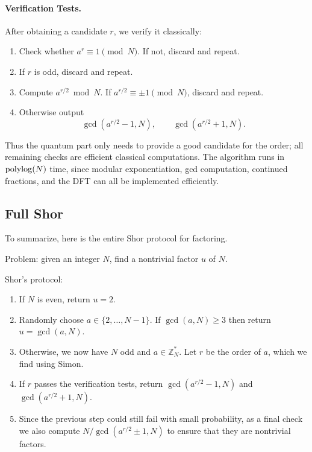 \paragraph{Verification Tests.} After obtaining a candidate \(r\), we verify it classically:
\begin{enumerate}
    \item Check whether \(a^r \equiv 1 \pmod N\). If not, discard and repeat.
    \item If \(r\) is odd, discard and repeat.
    \item Compute \(a^{r/2} \bmod N\). If \(a^{r/2} \equiv \pm1 \pmod N\), discard and repeat.
    \item Otherwise output
    \[
    \gcd(a^{r/2}-1,N), \qquad \gcd(a^{r/2}+1,N).
    \]
\end{enumerate}

Thus the quantum part only needs to provide a good candidate for the order; all remaining checks are efficient classical computations. The algorithm runs in $\operatorname{polylog}(N)$ time, since modular exponentiation, gcd computation, continued fractions, and the DFT can all be implemented efficiently.

\subsection{Full Shor}
To summarize, here is the entire Shor protocol for factoring.

Problem: given an integer $N$, find a nontrivial factor $u$ of $N$.

Shor's protocol:
\begin{enumerate}
    \item If $N$ is even, return $u=2$.
    
    \item Randomly choose $a \in \{2,\dots,N-1\}$. If $\gcd(a,N)\geq 3$ then return $u=\gcd(a,N)$.
    
    \item Otherwise, we now have $N$ odd and $a \in \mathbb{Z}_N^*$. Let $r$ be the order of $a$, which we find using Simon. 
    
    \item If $r$ passes the verification tests, return $\gcd(a^{r/2}-1,N)$ and $\gcd(a^{r/2}+1,N)$. 
    
    \item Since the previous step could still fail with small probability, as a final check we also compute $N/\gcd(a^{r/2}\pm 1,N)$ to ensure that they are nontrivial factors.
    
\end{enumerate}



